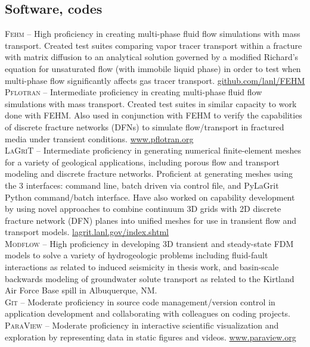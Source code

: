 \documentclass[11pt, letterpaper]{article}
\begin{document}
\subsection*{Software, codes}
\noindent
\textsc{Fehm} – High proficiency in creating multi-phase fluid flow simulations with mass transport. Created test suites comparing vapor tracer transport within a fracture with matrix diffusion to an analytical solution governed by a modified Richard’s equation for unsaturated flow (with immobile liquid phase) in order to test when multi-phase flow significantly affects gas tracer transport. \href{https://github.com/lanl/FEHM}{github.com/lanl/FEHM} \\[5pt]
\textsc{Pflotran} – Intermediate proficiency in creating multi-phase fluid flow simulations with mass transport. Created test suites in similar capacity to work done with FEHM. Also used in conjunction with FEHM to verify the capabilities of discrete fracture networks (DFNs) to simulate flow/transport in fractured media under transient conditions. \href{https://www.pflotran.org}{www.pflotran.org} \\[5pt]
\textsc{LaGriT} – Intermediate proficiency in generating numerical finite-element meshes for a variety of geological applications, including porous flow and transport modeling and discrete fracture networks. Proficient at generating meshes using the 3 interfaces: command line, batch driven via control file, and PyLaGrit Python command/batch interface. Have also worked on capability development by using novel approaches to combine continuum 3D grids with 2D discrete fracture network (DFN) planes into unified meshes for use in transient flow and transport models. \href{https://lagrit.lanl.gov/index.shtml}{lagrit.lanl.gov/index.shtml} \\[5pt]
\textsc{Modflow} – High proficiency in developing 3D transient and steady-state FDM models to solve a variety of hydrogeologic problems including fluid-fault interactions as related to induced seismicity in thesis work, and basin-scale backwards modeling of groundwater solute transport as related to the Kirtland Air Force Base spill in Albuquerque, NM.\\[5pt]
\textsc{Git} – Moderate proficiency in source code management/version control in application development and collaborating with colleagues on coding projects.\\[5pt]
\textsc{ParaView} – Moderate proficiency in interactive scientific visualization and exploration by representing data in static figures and videos. \href{https://www.paraview.org/}{www.paraview.org} \\[5pt]
\end{document}
